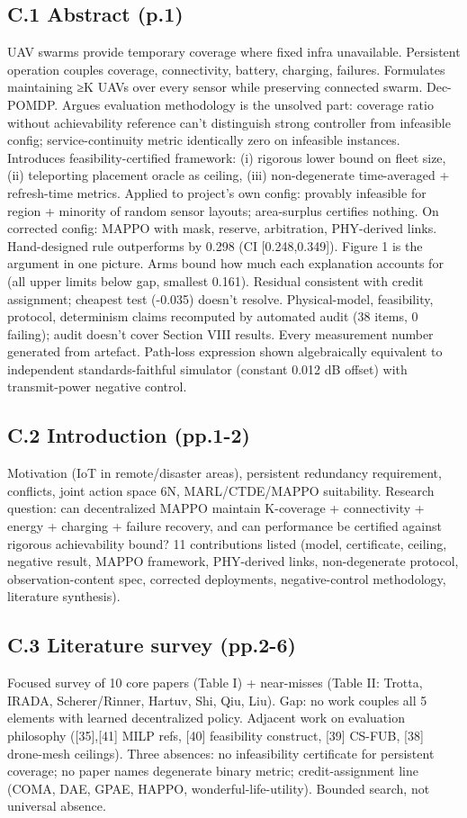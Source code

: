\documentclass[10pt]{article}
\begin{document}
\subsection{C.1 Abstract (p.1)}
UAV swarms provide temporary coverage where fixed infra unavailable. Persistent operation couples coverage, connectivity, battery, charging, failures. Formulates maintaining ≥K UAVs over every sensor while preserving connected swarm. Dec-POMDP. Argues evaluation methodology is the unsolved part: coverage ratio without achievability reference can't distinguish strong controller from infeasible config; service-continuity metric identically zero on infeasible instances. Introduces feasibility-certified framework: (i) rigorous lower bound on fleet size, (ii) teleporting placement oracle as ceiling, (iii) non-degenerate time-averaged + refresh-time metrics. Applied to project's own config: provably infeasible for region + minority of random sensor layouts; area-surplus certifies nothing. On corrected config: MAPPO with mask, reserve, arbitration, PHY-derived links. Hand-designed rule outperforms by 0.298 (CI [0.248,0.349]). Figure 1 is the argument in one picture. Arms bound how much each explanation accounts for (all upper limits below gap, smallest 0.161). Residual consistent with credit assignment; cheapest test (-0.035) doesn't resolve. Physical-model, feasibility, protocol, determinism claims recomputed by automated audit (38 items, 0 failing); audit doesn't cover Section VIII results. Every measurement number generated from artefact. Path-loss expression shown algebraically equivalent to independent standards-faithful simulator (constant 0.012 dB offset) with transmit-power negative control.

\subsection{C.2 Introduction (pp.1-2)}
Motivation (IoT in remote/disaster areas), persistent redundancy requirement, conflicts, joint action space 6N, MARL/CTDE/MAPPO suitability. Research question: can decentralized MAPPO maintain K-coverage + connectivity + energy + charging + failure recovery, and can performance be certified against rigorous achievability bound? 11 contributions listed (model, certificate, ceiling, negative result, MAPPO framework, PHY-derived links, non-degenerate protocol, observation-content spec, corrected deployments, negative-control methodology, literature synthesis).

\subsection{C.3 Literature survey (pp.2-6)}
Focused survey of 10 core papers (Table I) + near-misses (Table II: Trotta, IRADA, Scherer/Rinner, Hartuv, Shi, Qiu, Liu). Gap: no work couples all 5 elements with learned decentralized policy. Adjacent work on evaluation philosophy ([35],[41] MILP refs, [40] feasibility construct, [39] CS-FUB, [38] drone-mesh ceilings). Three absences: no infeasibility certificate for persistent coverage; no paper names degenerate binary metric; credit-assignment line (COMA, DAE, GPAE, HAPPO, wonderful-life-utility). Bounded search, not universal absence.
\end{document}
